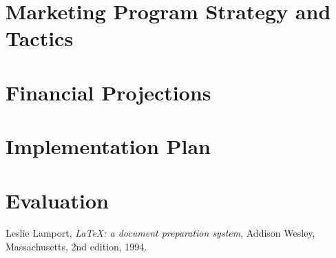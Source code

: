 \documentclass[12pt, letterpaper]{article}
\begin{document}
\section{Marketing Program Strategy and Tactics}
\section{Financial Projections}
\section{Implementation Plan}
\section{Evaluation}

\newpage

\begin{thebibliography}{9}

  Leslie Lamport,
  \emph{\LaTeX: a document preparation system},
  Addison Wesley, Massachusetts,
  2nd edition,
  1994.
  
\end{thebibliography}

\newpage

\begin{appendices}
\end{appendices}
\end{document}
